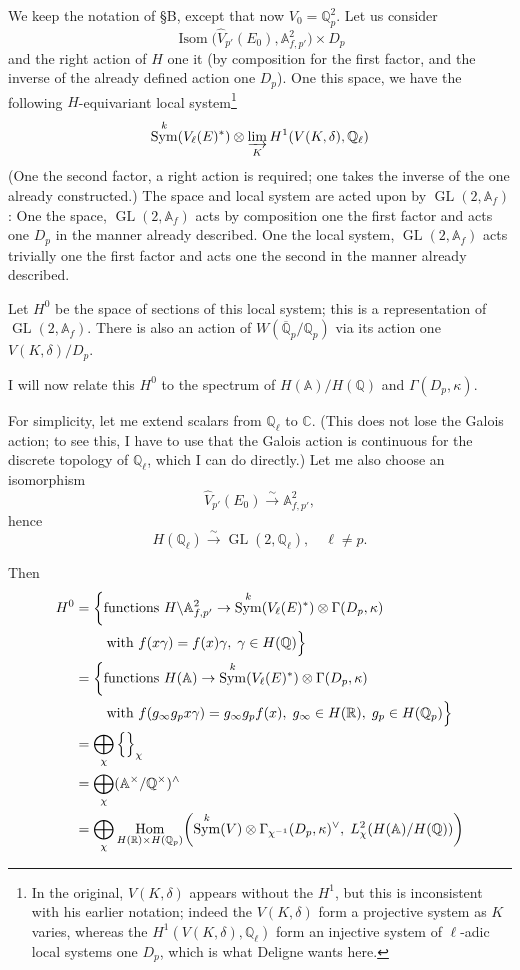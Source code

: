 \documentclass[11pt,a4paper]{article}
\theoremstyle{plain}
\theoremstyle{definition}
\theoremstyle{remark}
\DeclareMathOperator{\Hom}{Hom}
\DeclareMathOperator{\Isom}{Isom}
\DeclareMathOperator{\GL}{GL}
\DeclareMathOperator{\Sym}{Sym}
\newcommand{\A}{\mathbb{A}}
\newcommand{\C}{\mathbb{C}}
\newcommand{\Q}{\mathbb{Q}}
\newcommand{\R}{\mathbb{R}}
\newcommand{\Af}{\mathbb{A}_{f}}
\newcommand{\Qpbar}{\overline{\mathbb{Q}}_{p}}
\newcommand{\Qp}{\mathbb{Q}_{p}}
\newcommand{\Ql}{\mathbb{Q}_{\ell}}
\newcommand{\Vl}{V_{\ell}}
\begin{document}
We keep the notation of \S B, except that now $V_{0} = \Qp^{2}$. Let us consider
\[
\Isom\!\bigl(\widehat{V}_{p'}(E_{0}), \A_{f,p'}^{2}\bigr) \times D_{p}
\]
and the right action of $H$ one it (by composition for the first factor, and the inverse of the already defined action one $D_{p}$). One this space, we have the following $H$-equivariant local system\footnote{In the original, $V(K, \delta)$ appears without the $H^{1}$, but this is inconsistent with his earlier notation; indeed the $V(K, \delta)$ form a projective system as $K$ varies, whereas the $H^{1}(V(K, \delta), \Ql)$ form an injective system of $\ell$-adic local systems one $D_{p}$, which is what Deligne wants here.}
\[
\Sym^{k}(\Vl(E)^{*}) \otimes \varinjlim_{K} H^{1}(V(K, \delta), \Ql)
\]
(One the second factor, a right action is required; one takes the inverse of the one already constructed.) The space and local system are acted upon by $\GL(2, \Af)$:
One the space, $\GL(2, \Af)$ acts by composition one the first factor and acts one $D_{p}$ in the manner already described. One the local system, $\GL(2, \Af)$ acts trivially one the first factor and acts one the second in the manner already described.

Let $H^{0}$ be the space of sections of this local system; this is a representation of $\GL(2, \Af)$. There is also an action of $W(\Qpbar/\Qp)$ via its action one $V(K, \delta)/D_{p}$.

I will now relate this $H^{0}$ to the spectrum of $H(\mathbb{A})/H(\Q)$ and $\Gamma(D_{p}, \kappa)$.

For simplicity, let me extend scalars from $\Ql$ to $\C$. (This does not lose the Galois action; to see this, I have to use that the Galois action is continuous for the discrete topology of $\Ql$, which I can do directly.) Let me also choose an isomorphism
\[
\widehat{V}_{p'}(E_{0}) \xrightarrow{\sim} \A_{f,p'}^{2},
\]
hence
\[
H(\Ql) \xrightarrow{\sim} \GL(2, \Ql), \quad \ell \neq p.
\]

Then
\begin{align*}
H^{0} &= \left\{ \text{functions } H \backslash \A_{f,p'}^{2} \to \Sym^{k}(\Vl(E)^{*}) \otimes \Gamma(D_{p}, \kappa) \right. \\
&\qquad \left. \vphantom{\Big\{} \text{with } f(x\gamma) = f(x)\gamma, \; \gamma \in H(\Q) \right\} \\
&= \left\{ \text{functions } H(\mathbb{A}) \to \Sym^{k}(\Vl(E)^{*}) \otimes \Gamma(D_{p}, \kappa) \right. \\
&\qquad \left. \vphantom{\Big\{} \text{with } f(g_{\infty} g_{p} x \gamma) = g_{\infty} g_{p} f(x), \; g_{\infty} \in H(\R), \; g_{p} \in H(\Qp) \right\} \\
&= \bigoplus_{\chi} \left\{ \vphantom{\Big\{} \right\}_{\chi} \\
&= \bigoplus_{\chi} (\mathbb{A}^{\times}/\Q^{\times})^{\wedge} \\
&= \bigoplus_{\chi} \Hom_{H(\R) \times H(\Qp)}\!\left(\Sym^{k}(V) \otimes \Gamma_{\chi^{-1}}(D_{p}, \kappa)^{\vee}, \; L^{2}_{\chi}(H(\mathbb{A})/H(\Q))\right)
\end{align*}
\end{document}
